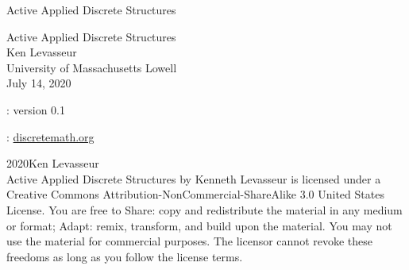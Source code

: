 \documentclass[oneside,10pt,]{book}
\newcommand{\titlepagefont}{\relax}
\numberwithin{equation}{section}
\begin{document}
\frontmatter
\thispagestyle{empty}
{\titlepagefont\centering
\vspace*{0.28\textheight}
{\Huge Active Applied Discrete Structures}\\}
\clearpage
\thispagestyle{empty}
\null%
\clearpage
\thispagestyle{empty}
{\titlepagefont\centering
\vspace*{0.14\textheight}
{\Huge Active Applied Discrete Structures}\\[3\baselineskip]
{\Large Ken Levasseur}\\[0.5\baselineskip]
{\Large University of Massachusetts Lowell}\\[3\baselineskip]
{\Large July 14, 2020}\\}
\clearpage
\thispagestyle{empty}
\hypertarget{g:colophon:idm128049273568}{}
: version 0.1\par\medskip
{}: \href{http:\slash{}\slash{}discretemath.org}{discretemath.org}\par\medskip
\noindent\textcopyright{}2020\quad{}Ken Levasseur\\[0.5\baselineskip]
Active Applied Discrete Structures by Kenneth Levasseur is licensed under a Creative Commons Attribution-NonCommercial-ShareAlike 3.0 United States License. You are free to Share: copy and redistribute the material in any medium or format; Adapt: remix, transform, and build upon the material. You may not use the material for commercial purposes.  The licensor cannot revoke these freedoms as long as you follow the license terms.\par\medskip
{}
\null\clearpage
%
%
\typeout{************************************************}
\typeout{************************************************}
%
\end{document}
